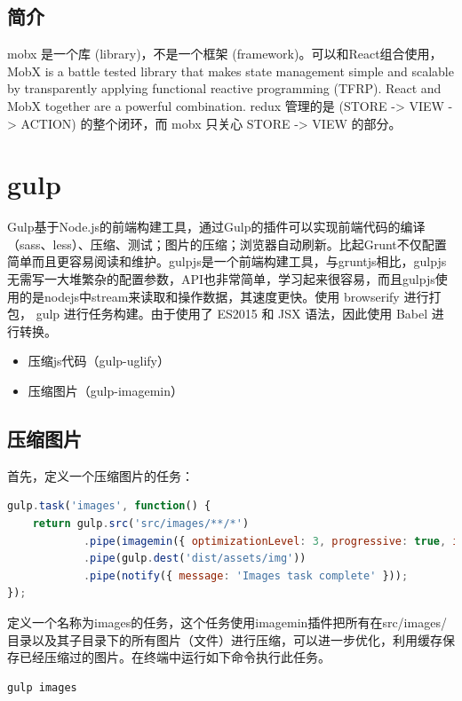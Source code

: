 \documentclass[letter]{book}
\begin{document}
\subsection{简介}

mobx 是一个库 (library)，不是一个框架 (framework)。可以和React组合使用，MobX is a battle tested library that makes state management simple and scalable by transparently applying functional reactive programming (TFRP). React and MobX together are a powerful combination. redux 管理的是 (STORE -> VIEW -> ACTION) 的整个闭环，而 mobx 只关心 STORE -> VIEW 的部分。

\section{gulp}

Gulp基于Node.js的前端构建工具，通过Gulp的插件可以实现前端代码的编译（sass、less）、压缩、测试；图片的压缩；浏览器自动刷新。比起Grunt不仅配置简单而且更容易阅读和维护。gulpjs是一个前端构建工具，与gruntjs相比，gulpjs无需写一大堆繁杂的配置参数，API也非常简单，学习起来很容易，而且gulpjs使用的是nodejs中stream来读取和操作数据，其速度更快。使用 browserify 进行打包， gulp 进行任务构建。由于使用了 ES2015 和 JSX 语法，因此使用 Babel 进行转换。

\begin{itemize}
	\item{压缩js代码（gulp-uglify）}
	\item{压缩图片（gulp-imagemin）}
\end{itemize}

\subsection{压缩图片}

首先，定义一个压缩图片的任务：

\begin{lstlisting}[language=JavaScript]
gulp.task('images', function() {
	return gulp.src('src/images/**/*')
			.pipe(imagemin({ optimizationLevel: 3, progressive: true, interlaced: true }))
			.pipe(gulp.dest('dist/assets/img'))
			.pipe(notify({ message: 'Images task complete' }));
});
\end{lstlisting}

定义一个名称为images的任务，这个任务使用imagemin插件把所有在src/images/目录以及其子目录下的所有图片（文件）进行压缩，可以进一步优化，利用缓存保存已经压缩过的图片。在终端中运行如下命令执行此任务。

\begin{lstlisting}[language=Bash]
gulp images
\end{lstlisting}
\end{document}
